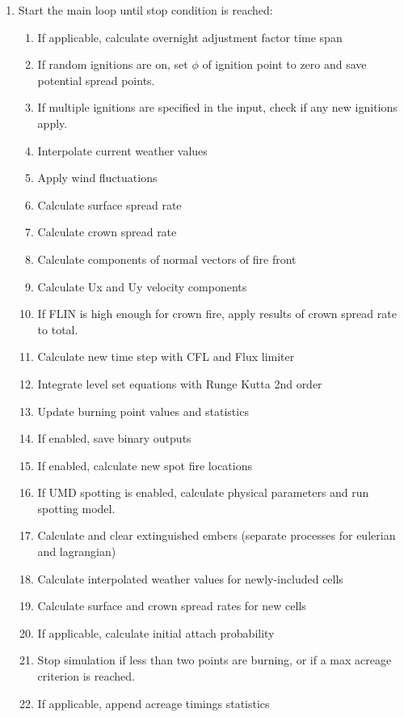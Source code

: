 \begin{enumerate}
    \item Start the main loop until stop condition is reached:
    \begin{enumerate}
        \item If applicable, calculate overnight adjustment factor time span
        \item If random ignitions are on, set $\phi$ of ignition point to zero and save potential spread points.
        \item If multiple ignitions are specified in the input, check if any new ignitions apply.
        \item Interpolate current weather values
        \item Apply wind fluctuations
        \item Calculate surface spread rate
        \item Calculate crown spread rate
        \item Calculate components of normal vectors of fire front
        \item Calculate Ux and Uy velocity components
        \item If FLIN is high enough for crown fire, apply results of crown spread rate to total.
        \item Calculate new time step with CFL and Flux limiter
        \item Integrate level set equations with Runge Kutta 2nd order
        \item Update burning point values and statistics
        \item If enabled, save binary outputs
        \item If enabled, calculate new spot fire locations
        \item If UMD spotting is enabled, calculate physical parameters and run spotting model.
        \item Calculate and clear extinguished embers (separate processes for eulerian and lagrangian)
        \item Calculate interpolated weather values for newly-included cells
        \item Calculate surface and crown spread rates for new cells
        \item If applicable, calculate initial attach probability
        \item Stop simulation if less than two points are burning, or if a max acreage criterion is reached.
        \item If applicable, append acreage timings statistics

\end{enumerate}
\end{enumerate}
